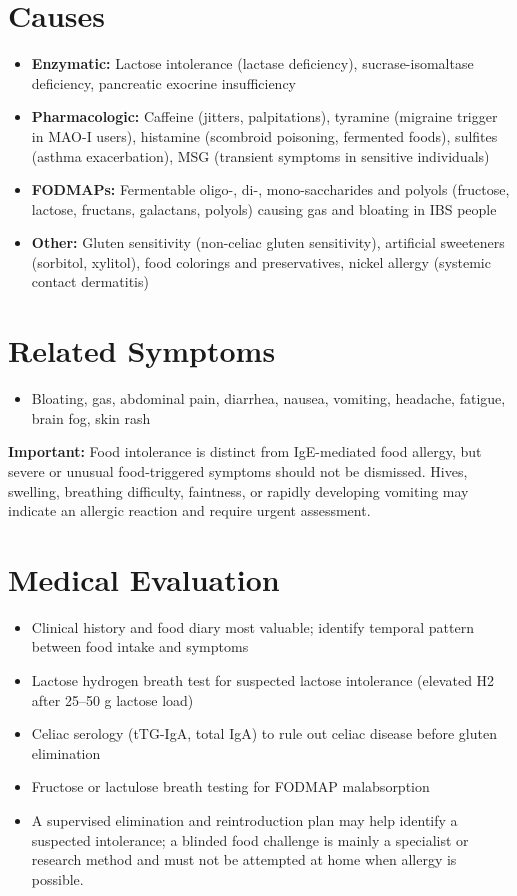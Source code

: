 \section*{Causes}
\begin{itemize}
  \item \textbf{Enzymatic:} Lactose intolerance (lactase deficiency), sucrase-isomaltase deficiency, pancreatic exocrine insufficiency
  \item \textbf{Pharmacologic:} Caffeine (jitters, palpitations), tyramine (migraine trigger in MAO-I users), histamine (scombroid poisoning, fermented foods), sulfites (asthma exacerbation), MSG (transient symptoms in sensitive individuals)
  \item \textbf{FODMAPs:} Fermentable oligo-, di-, mono-saccharides and polyols (fructose, lactose, fructans, galactans, polyols) causing gas and bloating in IBS people
  \item \textbf{Other:} Gluten sensitivity (non-celiac gluten sensitivity), artificial sweeteners (sorbitol, xylitol), food colorings and preservatives, nickel allergy (systemic contact dermatitis)
\end{itemize}

\section*{Related Symptoms}
\begin{itemize}
  \item Bloating, gas, abdominal pain, diarrhea, nausea, vomiting, headache, fatigue, brain fog, skin rash
\end{itemize}
\textbf{Important:} Food intolerance is distinct from IgE-mediated food allergy, but severe or unusual food-triggered symptoms should not be dismissed. Hives, swelling, breathing difficulty, faintness, or rapidly developing vomiting may indicate an allergic reaction and require urgent assessment.

\section*{Medical Evaluation}
\begin{itemize}
  \item Clinical history and food diary most valuable; identify temporal pattern between food intake and symptoms
  \item Lactose hydrogen breath test for suspected lactose intolerance (elevated H2 after 25--50 g lactose load)
  \item Celiac serology (tTG-IgA, total IgA) to rule out celiac disease before gluten elimination
  \item Fructose or lactulose breath testing for FODMAP malabsorption
  \item A supervised elimination and reintroduction plan may help identify a suspected intolerance; a blinded food challenge is mainly a specialist or research method and must not be attempted at home when allergy is possible.
\end{itemize}

